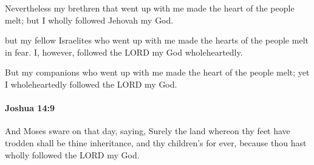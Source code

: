 			\begin{versebox}
					\item[BHS] 
					\item[ASV] Nevertheless my brethren that went up with me made the heart of the people melt; but I wholly followed Jehovah my God.
					\item[NIV] but my fellow Israelites who went up with me made the hearts of the people melt in fear. I, however, followed the LORD my God wholeheartedly.
					\item[NRSV] But my companions who went up with me made the heart of the people melt; yet I wholeheartedly followed the LORD my God.
			\end{versebox}

		\paragraph{Joshua 14:9} %
			\label{JOSHUA-14-9}

			And Moses sware on that day, saying, Surely the land whereon thy feet have trodden shall be thine inheritance, and thy children’s for ever, because thou hast wholly followed the LORD my God.

